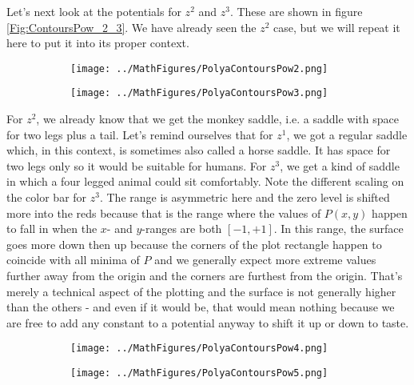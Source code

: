 \documentclass[12pt]{article}
\begin{document}
\medskip
Let's next look at the potentials for $z^2$ and $z^3$. These are shown in figure \ref{Fig:ContoursPow_2_3}. We have already seen the $z^2$ case, but we will repeat it here to put it into its proper context.
\begin{figure}[p]
\caption{Polya potential contours of $f(z) = z^2$ and $f(z) = z^3$}	
\label{Fig:ContoursPow_2_3}	
\centering
\begin{subfigure}[b]{0.49\textwidth}
\centering
\texttt{[image: ../MathFigures/PolyaContoursPow2.png]}
\end{subfigure}
\begin{subfigure}[b]{0.49\textwidth}
\centering
\texttt{[image: ../MathFigures/PolyaContoursPow3.png]}
\end{subfigure}
\end{figure}
For $z^2$, we already know that we get the monkey saddle, i.e. a saddle with space for two legs plus a tail. Let's remind ourselves that for $z^1$, we got a regular saddle which, in this context, is sometimes also called a horse saddle. It has space for two legs only so it would be suitable for humans. For $z^3$, we get a kind of saddle in which a four legged animal could sit comfortably. Note the different scaling on the color bar for $z^3$. The range is asymmetric here and the zero level is shifted more into the reds because that is the range where the values of $P(x,y)$ happen to fall in when the $x$- and $y$-ranges are both $[-1,+1]$. In this range, the surface goes more down then up because the corners of the plot rectangle happen to coincide with all minima of $P$ and we generally expect more extreme values further away from the origin and the corners are furthest from the origin. That's merely a technical aspect of the plotting and the surface is not generally higher than the others - and even if it would be, that would mean nothing because we are free to add any constant to a potential anyway to shift it up or down to taste. 

\begin{figure}[p]
\caption{Polya potential contours of $f(z) = z^4$ and $f(z) = z^5$}	
\label{Fig:ContoursPow_4_5}	
\centering
\begin{subfigure}[b]{0.49\textwidth}
\centering
\texttt{[image: ../MathFigures/PolyaContoursPow4.png]}
\end{subfigure}
\begin{subfigure}[b]{0.49\textwidth}
\centering
\texttt{[image: ../MathFigures/PolyaContoursPow5.png]}
\end{subfigure}
\end{figure}
\end{document}
